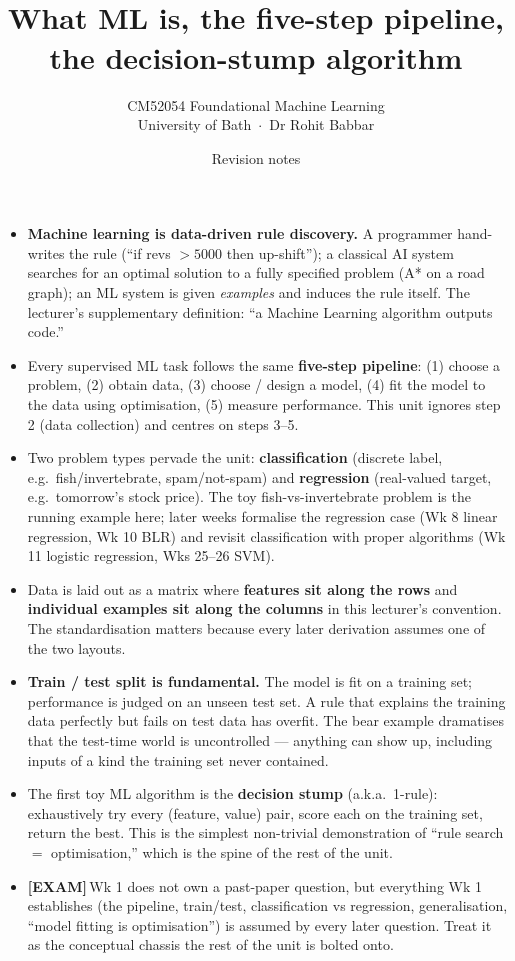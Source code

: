 \documentclass[11pt, a4paper]{article}
\title{\vspace{-1cm}{\Huge\bfseries Week 1 — Introduction} \\[0.4em]{\large What ML is, the five-step pipeline, the decision-stump algorithm}}
\author{\large CM52054 Foundational Machine Learning \\[0.2em]\normalsize University of Bath \,$\cdot$\, Dr Rohit Babbar}
\date{Revision notes}
\newcommand{\examflag}{\textcolor{tipBd}{\textbf{[EXAM]}}\,}
\begin{document}
\maketitle
\thispagestyle{empty}

\vspace{1em}

\begin{tldrbox}
\begin{itemize}[leftmargin=*]
  \item \textbf{Machine learning is data-driven rule discovery.} A programmer hand-writes the rule (``if revs $> 5000$ then up-shift''); a classical AI system searches for an optimal solution to a fully specified problem (A* on a road graph); an ML system is given \emph{examples} and induces the rule itself. The lecturer's supplementary definition: ``a Machine Learning algorithm outputs code.''
  \item Every supervised ML task follows the same \textbf{five-step pipeline}: (1) choose a problem, (2) obtain data, (3) choose / design a model, (4) fit the model to the data using optimisation, (5) measure performance. This unit ignores step 2 (data collection) and centres on steps 3--5.
  \item Two problem types pervade the unit: \textbf{classification} (discrete label, e.g.\ fish/invertebrate, spam/not-spam) and \textbf{regression} (real-valued target, e.g.\ tomorrow's stock price). The toy fish-vs-invertebrate problem is the running example here; later weeks formalise the regression case (Wk 8 linear regression, Wk 10 BLR) and revisit classification with proper algorithms (Wk 11 logistic regression, Wks 25--26 SVM).
  \item Data is laid out as a matrix where \textbf{features sit along the rows} and \textbf{individual examples sit along the columns} in this lecturer's convention. The standardisation matters because every later derivation assumes one of the two layouts.
  \item \textbf{Train / test split is fundamental.} The model is fit on a training set; performance is judged on an unseen test set. A rule that explains the training data perfectly but fails on test data has overfit. The bear example dramatises that the test-time world is uncontrolled — anything can show up, including inputs of a kind the training set never contained.
  \item The first toy ML algorithm is the \textbf{decision stump} (a.k.a.\ 1-rule): exhaustively try every (feature, value) pair, score each on the training set, return the best. This is the simplest non-trivial demonstration of ``rule search $=$ optimisation,'' which is the spine of the rest of the unit.
  \item \examflag{}Wk 1 does not own a past-paper question, but everything Wk 1 establishes (the pipeline, train/test, classification vs regression, generalisation, ``model fitting is optimisation'') is assumed by every later question. Treat it as the conceptual chassis the rest of the unit is bolted onto.
\end{itemize}
\end{tldrbox}
\end{document}
